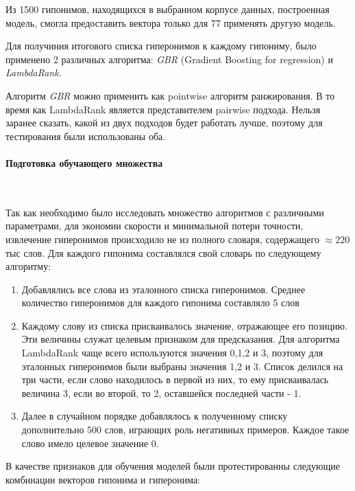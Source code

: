 Из 1500 гипонимов, находящихся в выбранном корпусе данных, построенная модель,
смогла предоставить вектора только для 77%
применять другую модель.

Для получиния итогового списка гиперонимов к каждому гипониму, было применено 2
различных алгоритма: \textit{GBR} (Gradient Boosting for regression) и \textit{LambdaRank}.

Алгоритм \textit{GBR} можно применить как pointwise алгоритм ранжирования. В то время как
LambdaRank является представителем pairwise подхода. Нельзя заранее сказать, какой из
двух подходов будет работать лучше, поэтому для тестирования были использованы оба.

\paragraph{Подготовка обучающего множества}
~\
~\

Так как необходимо было исследовать множество алгоритмов с различными параметрами,
для экономии скорости и минимальной потери точности, извлечение гиперонимов
происходило не из полного словаря, содержащего $\approx 220$ тыс слов. Для каждого гипонима
составлялся свой словарь по следующему алгоритму:

\begin{enumerate}
\item Добавлялись все слова из эталонного списка гиперонимов. Среднее количество
гиперонимов для каждого гипонима составляло 5 слов

\item Каждому слову из списка присваивалось значение, отражающее его позицию. Эти
величины служат целевым признаком для предсказания. Для алгоритма
LambdaRank чаще всего используются значения 0,1,2 и 3, поэтому для эталонных
гиперонимов были выбраны значения 1,2 и 3. Список делился на три части, если
слово находилось в первой из них, то ему присваивалась величина 3, если во
второй, то 2, оставшейся последней части - 1.

\item Далее в случайном порядке добавлялось к полученному списку дополнительно 500
слов, играющих роль негативных примеров. Каждое такое слово имело целевое
значение 0.
\end{enumerate}

В качестве признаков для обучения моделей были протестированны следующие
комбинации векторов гипонима и гиперонима:

